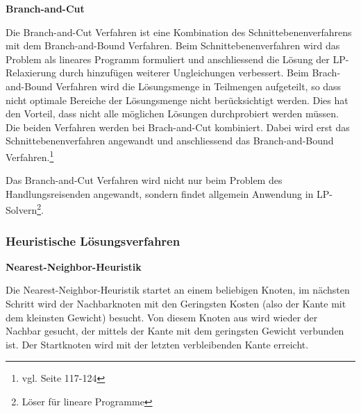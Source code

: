 \documentclass[11pt,a4paper]{article}
\begin{document}
\medskip

\begin{flushleft}
\textbf{Branch-and-Cut}

Die Branch-and-Cut Verfahren ist eine Kombination des Schnittebenenverfahrens mit dem Branch-and-Bound Verfahren. 
Beim Schnittebenenverfahren wird das Problem als lineares Programm formuliert und anschliessend die Lösung der LP-Relaxierung durch hinzufügen weiterer Ungleichungen verbessert.
Beim Brach-and-Bound Verfahren wird die Lösungsmenge in Teilmengen aufgeteilt, so dass nicht optimale Bereiche der Lösungsmenge nicht berücksichtigt werden. Dies hat den Vorteil, dass nicht alle möglichen Lösungen durchprobiert werden müssen.
Die beiden Verfahren werden bei Brach-and-Cut kombiniert. Dabei wird erst das Schnittebenenverfahren angewandt und anschliessend das Branch-and-Bound Verfahren.\footnote{vgl. \cite{applegate06} Seite 117-124}

Das Branch-and-Cut Verfahren wird nicht nur beim Problem des Handlungsreisenden angewandt, sondern findet allgemein Anwendung in LP-Solvern\footnote{Löser für lineare Programme}.

\end{flushleft}

\subsubsection{Heuristische Lösungsverfahren}
\begin{flushleft}
\textbf{Nearest-Neighbor-Heuristik}

Die Nearest-Neighbor-Heuristik startet an einem beliebigen Knoten, im nächsten Schritt wird der Nachbarknoten mit den Geringsten Kosten (also der Kante mit dem kleinsten Gewicht) besucht. Von diesem Knoten aus wird wieder der Nachbar gesucht, der mittels der Kante  mit dem geringsten Gewicht verbunden ist. Der Startknoten wird mit der letzten verbleibenden Kante erreicht.\cite{gutin02}
\end{flushleft}

\medskip
\end{document}
